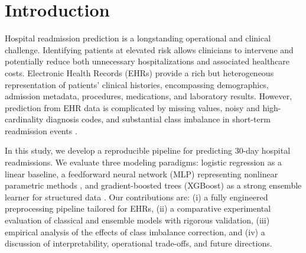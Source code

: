 \begin{abstract}
We present a complete, reproducible pipeline and empirical study for predicting hospital readmission within 30 days using the \emph{Diabetes 130-US Hospitals} dataset \cite{diabetes_130-us_hospitals_for_years_1999-2008_296}. Our work focuses on practical preprocessing, robust imbalance handling, and a direct comparison of interpretable models (logistic regression), parametric neural models (multilayer perceptrons, MLP), and tree-ensemble approaches (XGBoost) \cite{friedman2001gbm,breiman2001rf,chen2016xgboost}. The pipeline includes end-to-end engineering steps such as feature cleaning, encoding, scaling, oversampling via SMOTE \cite{chawla2002smote}, and feature selection using gradient-boosted gain scores. We evaluate models extensively through ROC and PR curves, loss curves, feature importance analyses, confusion matrices, and threshold tuning. We report empirical performance with rigorous cross-validation and external hold-out evaluation, highlight trade-offs between interpretability and predictive power, and discuss next steps involving temporal modeling \cite{choi2016doctor,vaswani2017attention}, calibration \cite{zadrozny2001calibration,platt1999probabilistic}, and causal evaluation \cite{pearl2009causality,shalit2017estimating}. The full source code and reproducibility artifacts are available at: \url{https://arrdel.github.io/patient-readmission-prediction/}.
\end{abstract}


\section{Introduction}
Hospital readmission prediction is a longstanding operational and clinical challenge. Identifying patients at elevated risk allows clinicians to intervene and potentially reduce both unnecessary hospitalizations and associated healthcare costs. Electronic Health Records (EHRs) provide a rich but heterogeneous representation of patients' clinical histories, encompassing demographics, admission metadata, procedures, medications, and laboratory results. However, prediction from EHR data is complicated by missing values, noisy and high-cardinality diagnosis codes, and substantial class imbalance in short-term readmission events \cite{hripcsak2015challenges}.

In this study, we develop a reproducible pipeline for predicting 30-day hospital readmissions. We evaluate three modeling paradigms: logistic regression as a linear baseline, a feedforward neural network (MLP) representing nonlinear parametric methods \cite{lecun1998gradient}, and gradient-boosted trees (XGBoost) as a strong ensemble learner for structured data \cite{chen2016xgboost}. Our contributions are: (i) a fully engineered preprocessing pipeline tailored for EHRs, (ii) a comparative experimental evaluation of classical and ensemble models with rigorous validation, (iii) empirical analysis of the effects of class imbalance correction, and (iv) a discussion of interpretability, operational trade-offs, and future directions.


